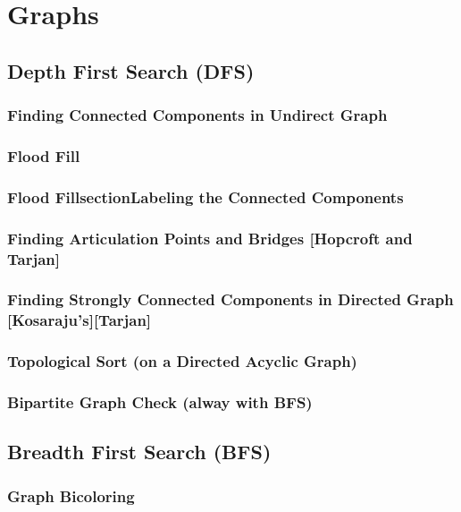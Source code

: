\chapter{Graphs}
\section {Depth First Search (DFS)}
	
	\subsection {Finding Connected Components in Undirect Graph}
		
	\subsection {Flood Fill}
		
	\subsection {Flood FillsectionLabeling the Connected Components}
	\subsection {Finding Articulation Points and Bridges [Hopcroft and Tarjan]}
		
	\subsection {Finding Strongly Connected Components in Directed Graph [Kosaraju's][Tarjan]}
	\subsection {Topological Sort (on a Directed Acyclic Graph)}
	\subsection {Bipartite Graph Check (alway with BFS)}
\section {Breadth First Search (BFS)}
	
	\subsection {Graph Bicoloring}
	  
